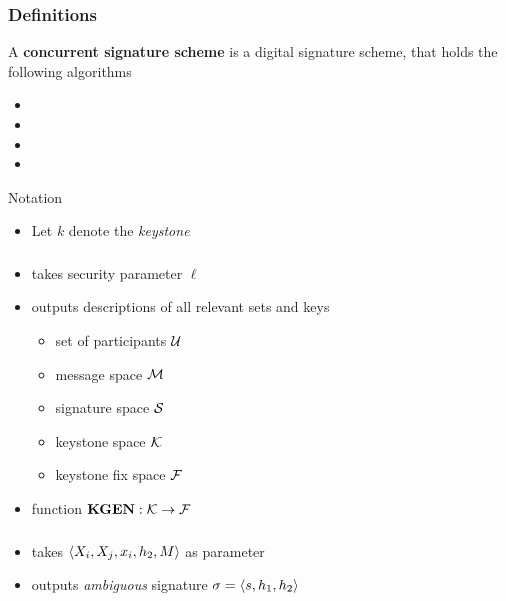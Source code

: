 \begin{frame}
	\frametitle{Definitions}

	\begin{definition}
		A \textbf{concurrent signature scheme} is a digital signature scheme, that holds the following algorithms
		\begin{itemize}
			\item \setup
			\item \asign
			\item \averify
			\item \verify
		\end{itemize}
	\end{definition}

	\begin{block}{Notation}
		\begin{itemize}
			\item Let $k$ denote the \textit{keystone}
		\end{itemize}
	\end{block}
\end{frame}

\begin{frame}
	\frametitle{\setup}

	\begin{itemize}
		\item takes security parameter $\ell$
		\item outputs descriptions of all relevant sets and keys
			\begin{itemize}
				\item set of participants $\mathcal{U}$
				\item message space $\mathcal{M}$
				\item signature space $\mathcal{S}$
				\item keystone space $\mathcal{K}$
				\item keystone fix space $\mathcal{F}$
			\end{itemize}
		\item function $\textbf{KGEN}: \mathcal{K} \to \mathcal{F}$
	\end{itemize}
\end{frame}

\begin{frame}
	\frametitle{\asign}

	\begin{center}	
	\end{center}

	\begin{itemize}
		\item takes $\langle X_i, X_j, x_i, h_2, M \rangle$ as parameter
		\item outputs \textit{ambiguous} signature $\sigma = \langle s, h_1, h_2 \rangle$
	\end{itemize}
\end{frame}

